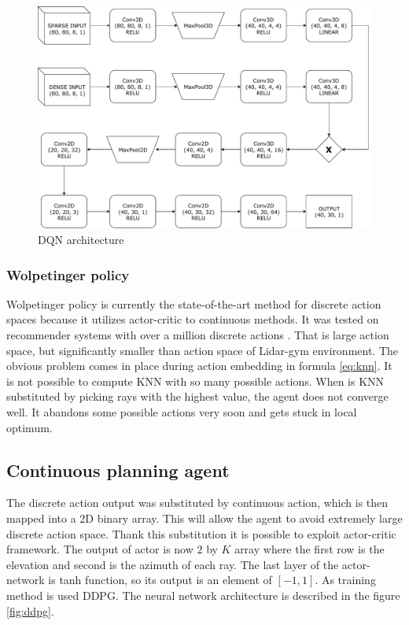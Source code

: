 \vspace{3mm}
\begin{figure}[!h]
\centering
\includegraphics[scale=0.6]{fig/dql.pdf}
\caption{DQN architecture}
\label{fig:dqn}
\end{figure}

\subsubsection{Wolpetinger policy}
Wolpetinger policy is currently the state-of-the-art method for discrete action spaces because it utilizes actor-critic to continuous methods. It was tested on recommender systems with over a million discrete actions \cite{dulac2015}. That is large action space, but significantly smaller than action space of Lidar-gym environment. The obvious problem comes in place during action embedding in formula \eqref{eq:knn}. It is not possible to compute KNN with so many possible actions. When is KNN substituted by picking rays with the highest value, the agent does not converge well. It abandons some possible actions very soon and gets stuck in local optimum.

\clearpage
\subsection{Continuous planning agent}
The discrete action output was substituted by continuous action, which is then mapped into a 2D binary array. This will allow the agent to avoid extremely large discrete action space. Thank this substitution it is possible to exploit actor-critic framework. The output of actor is now $2$ by $K$ array where the first row is the elevation and second is the azimuth of each ray. The last layer of the actor-network is tanh function, so its output is an element of $[-1, 1]$. As training method is used DDPG. The neural network architecture is described in the figure \ref{fig:ddpg}.

